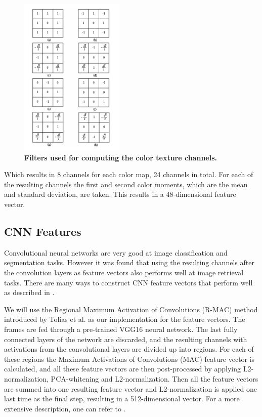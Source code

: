 \documentclass{article}
\begin{document}
\begin{figure}[H]
	\includegraphics[width=5cm]{images/filters.png}
	\centering
	\caption{\textbf{Filters used for computing the color texture channels.}}
	\label{fig:filters}
\end{figure}

Which results in 8 channels for each color map, 24 channels in total. For each of the resulting channels the first and second color moments, which are the mean and standard deviation, are taken. This results in a 48-dimensional feature vector.

\subsection{CNN Features} 
Convolutional neural networks are very good at image classification and segmentation tasks. However it was found that using the resulting channels after the convolution layers as feature vectors also performs well at image retrieval tasks. There are many ways to construct CNN feature vectors that perform well as described in \cite{zheng2018sift}.

We will use the Regional Maximum Activation of Convolutions (R-MAC) method introduced by Tolias et al. \cite{tolias2015particular} as our implementation for the feature vectors. The frames are fed through a pre-trained VGG16 neural network. The last fully connected layers of the network are discarded, and the resulting channels with activations from the convolutional layers are divided up into regions. For each of these regions the Maximum Activations of Convolutions (MAC) feature vector is calculated, and all these feature vectors are then post-processed by applying L2-normalization, PCA-whitening and L2-normalization. Then all the feature vectors are summed into one resulting feature vector and L2-normalization is applied one last time as the final step, resulting in a 512-dimensional vector. For a more extensive description, one can refer to \cite{tolias2015particular}.
\end{document}
